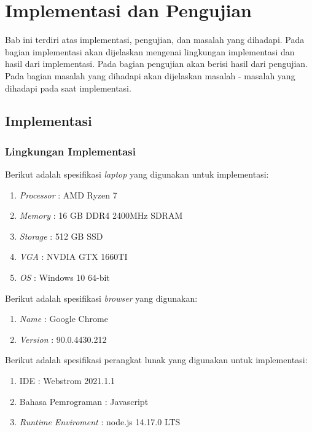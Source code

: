 \chapter{Implementasi dan Pengujian}
\label{chap:implementasi_dan_pengujian}

Bab ini terdiri atas implementasi, pengujian, dan masalah yang dihadapi. Pada bagian implementasi akan dijelaskan mengenai lingkungan implementasi dan hasil dari implementasi. Pada bagian pengujian akan berisi hasil dari pengujian. Pada bagian masalah yang dihadapi akan dijelaskan masalah - masalah yang dihadapi pada saat implementasi.


\section{Implementasi}
\label{sec:implementasi}

\subsection{Lingkungan Implementasi}
\label{sec:lingkungan_implementasi_dan_pengujian}

Berikut adalah spesifikasi \textit{laptop} yang digunakan untuk implementasi:
\begin{enumerate}
    \item \textit{Processor} : AMD Ryzen 7 
    \item \textit{Memory} : 16 GB DDR4 2400MHz SDRAM
    \item \textit{Storage} :  512 GB SSD
    \item \textit{VGA} : NVDIA GTX 1660TI
    \item \textit{OS} : Windows 10 64-bit\\
\end{enumerate}

Berikut adalah spesifikasi \textit{browser} yang digunakan:
\begin{enumerate}
    \item \textit{Name} : Google Chrome  
    \item \textit{Version} : 90.0.4430.212 \\
\end{enumerate}

Berikut adalah spesifikasi perangkat lunak yang digunakan untuk implementasi:
\begin{enumerate}
    \item IDE : Webstrom 2021.1.1
    \item Bahasa Pemrograman : Javascript
    \item \textit{Runtime Enviroment} : node.js 14.17.0 LTS
\end{enumerate}

